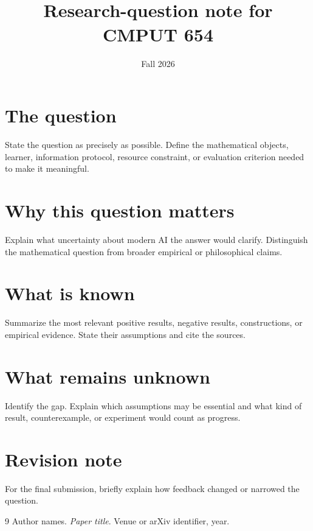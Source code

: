 \documentclass[11pt]{article}
\title{\workingtitle\\[0.4em]
\large Research-question note for CMPUT 654}
\author{\studentname}
\date{Fall 2026}
\begin{document}
\maketitle

\section{The question}
State the question as precisely as possible. Define the mathematical objects,
learner, information protocol, resource constraint, or evaluation criterion
needed to make it meaningful.

\section{Why this question matters}
Explain what uncertainty about modern AI the answer would clarify. Distinguish
the mathematical question from broader empirical or philosophical claims.

\section{What is known}
Summarize the most relevant positive results, negative results, constructions,
or empirical evidence. State their assumptions and cite the sources.

\section{What remains unknown}
Identify the gap. Explain which assumptions may be essential and what kind of
result, counterexample, or experiment would count as progress.

\section{Revision note}
For the final submission, briefly explain how feedback changed or narrowed the
question.

\begin{thebibliography}{9}
Author names.
\newblock \emph{Paper title}.
\newblock Venue or arXiv identifier, year.
\end{thebibliography}
\end{document}
